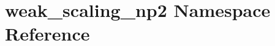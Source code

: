 \hypertarget{namespaceweak__scaling__np2}{}\section{weak\+\_\+scaling\+\_\+np2 Namespace Reference}
\label{namespaceweak__scaling__np2}

